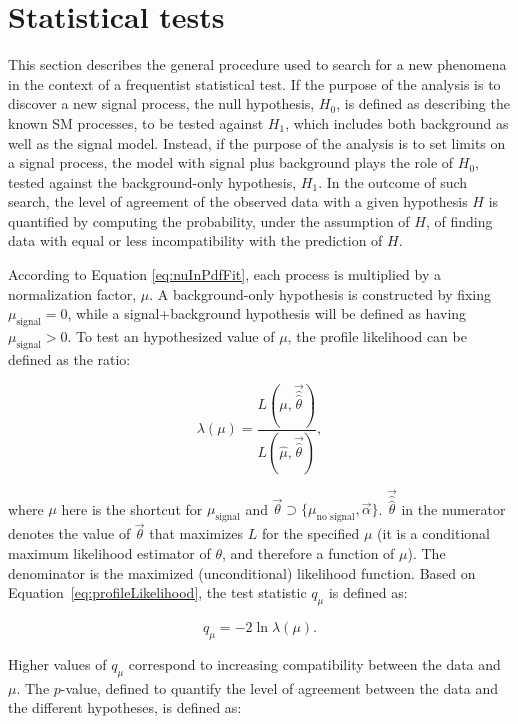 \section{Statistical tests}
    \label{subsec:StatisticalTests}

This section describes the general procedure used to search for a new phenomena in the context of a frequentist statistical test.
If the purpose of the analysis is to discover a new signal process, the null hypothesis, $H_0$, is defined as describing the known SM processes, to be tested against $H_1$, which includes both background as well as the signal model.
Instead, if the purpose of the analysis is to set limits on a signal process, the model with signal plus background plays the role of $H_0$, tested against the background-only hypothesis, $H_1$.
In the outcome of such search, the level of agreement of the observed data with a given hypothesis $H$ is quantified by computing the probability, under the assumption of $H$, of finding data with equal or less incompatibility with the prediction of $H$.

According to Equation \ref{eq:nuInPdfFit}, each process is multiplied by a normalization factor, $\mu$.
A background-only hypothesis is constructed by fixing $\mu_\text{signal}=0$, while a signal+background hypothesis will be defined as having $\mu_\text{signal}\gt0$.
To test an hypothesized value of $\mu$, the profile likelihood can be defined as the ratio:

\begin{equation}
\lambda(\mu) = \frac{L(\mu, \vec{\hat{\hat{\theta}}})}{L(\hat{\mu}, \vec{\hat{\theta}})},
\label{eq:profileLikelihood}
\end{equation}

\noindent where $\mu$ here is the shortcut for $\mu_\text{signal}$ and $\vec{\theta}\supset\{\mu_{\text{no signal}}, \vec{\alpha}\}$.
$\vec{\hat{\hat{\theta}}}$ in the numerator denotes the value of $\vec{\theta}$ that maximizes $L$ for the specified $\mu$ (it is a conditional maximum likelihood estimator of $\theta$, and therefore a function of $\mu$).
The denominator is the maximized (unconditional) likelihood function.
Based on Equation~\ref{eq:profileLikelihood}, the test statistic $q_\mu$ is defined as:

\begin{equation}
q_\mu = -2\ln{\lambda(\mu)}.
\label{eq:testStatistic}
\end{equation}

Higher values of $q_\mu$ correspond to increasing compatibility between the data and $\mu$.
The $p$-value, defined to quantify the level of agreement between the data and the different hypotheses, is defined as:

